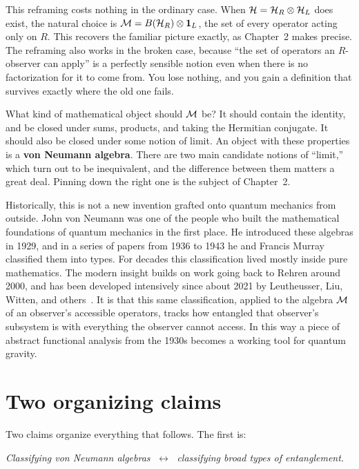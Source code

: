 This reframing costs nothing in the ordinary case. When $\mathcal{H}=\mathcal{H}_R\otimes\mathcal{H}_L$ does exist, the natural
choice is $\mathcal{M}=B(\mathcal{H}_R)\otimes\mathbf{1}_L$, the set of every operator acting only on $R$. This recovers the familiar
picture exactly, as Chapter~2 makes precise. The reframing also works in the broken case, because ``the set
of operators an $R$-observer can apply'' is a perfectly sensible notion even when there is no factorization
for it to come from. You lose nothing, and you gain a definition that survives exactly where the old one
fails.

What kind of mathematical object should $\mathcal{M}$ be? It should contain the identity, and be closed under sums,
products, and taking the Hermitian conjugate. It should also be closed under some notion of limit. An object
with these properties is a \textbf{von Neumann algebra}. There are two main candidate notions of ``limit,''
which turn out to be inequivalent, and the difference between them matters a great deal. Pinning down the
right one is the subject of Chapter~2.

Historically, this is not a new invention grafted onto quantum mechanics from outside. John von Neumann was
one of the people who built the mathematical foundations of quantum mechanics in the first place. He
introduced these algebras in 1929, and in a series of papers from 1936 to 1943 he and Francis Murray
classified them into types. For decades this classification lived mostly inside pure mathematics. The modern
insight builds on work going back to Rehren around 2000, and has been developed intensively since about
2021 by Leutheusser, Liu, Witten, and others~\cite{Liu2025}. It is that this same classification, applied to
the algebra $\mathcal{M}$ of an observer's accessible operators, tracks how entangled that observer's subsystem is with
everything the observer cannot access. In this way a piece of abstract functional analysis from the 1930s
becomes a working tool for quantum gravity.

\section{Two organizing claims}

Two claims organize everything that follows. The first is:

\begin{center}
\emph{Classifying von Neumann algebras} $\;\longleftrightarrow\;$ \emph{classifying broad types of
entanglement.}
\end{center}

